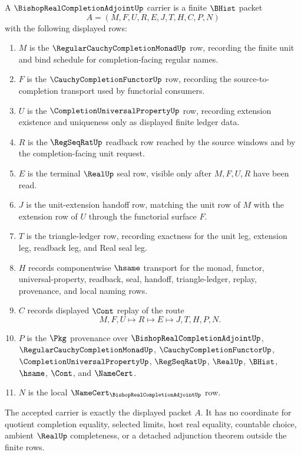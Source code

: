 \begin{definition}
\label{def:bishop-real-completion-adjoint-carrier}
A $\BishopRealCompletionAdjointUp$ carrier is a finite $\BHist$ packet
$$
A=(M,F,U,R,E,J,T,H,C,P,N)
$$
with the following displayed rows:
\begin{enumerate}
\item $M$ is the $\RegularCauchyCompletionMonadUp$ row, recording the finite unit and bind schedule for completion-facing regular names.
\item $F$ is the $\CauchyCompletionFunctorUp$ row, recording the source-to-completion transport used by functorial consumers.
\item $U$ is the $\CompletionUniversalPropertyUp$ row, recording extension existence and uniqueness only as displayed finite ledger data.
\item $R$ is the $\RegSeqRatUp$ readback row reached by the source windows and by the completion-facing unit request.
\item $E$ is the terminal $\RealUp$ seal row, visible only after $M,F,U,R$ have been read.
\item $J$ is the unit-extension handoff row, matching the unit row of $M$ with the extension row of $U$ through the functorial surface $F$.
\item $T$ is the triangle-ledger row, recording exactness for the unit leg, extension leg, readback leg, and Real seal leg.
\item $H$ records componentwise $\hsame$ transport for the monad, functor, universal-property, readback, seal, handoff, triangle-ledger, replay, provenance, and local naming rows.
\item $C$ records displayed $\Cont$ replay of the route
$$
M,F,U \longmapsto R \longmapsto E \longmapsto J,T,H,P,N .
$$
\item $P$ is the $\Pkg$ provenance over $\BishopRealCompletionAdjointUp$, $\RegularCauchyCompletionMonadUp$, $\CauchyCompletionFunctorUp$, $\CompletionUniversalPropertyUp$, $\RegSeqRatUp$, $\RealUp$, $\BHist$, $\hsame$, $\Cont$, and $\NameCert$.
\item $N$ is the local $\NameCert_{\BishopRealCompletionAdjointUp}$ row.
\end{enumerate}
The accepted carrier is exactly the displayed packet $A$. It has no coordinate for quotient completion equality, selected limits, host real equality, countable choice, ambient $\RealUp$ completeness, or a detached adjunction theorem outside the finite rows.
\end{definition}

